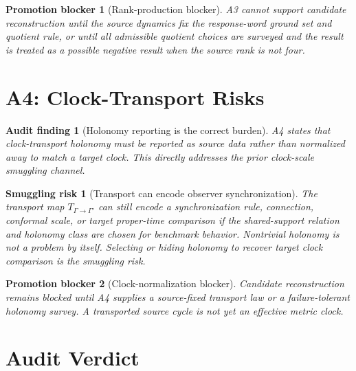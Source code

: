\documentclass[11pt]{article}
\newtheorem{auditfinding}{Audit finding}
\newtheorem{smugglingrisk}{Smuggling risk}
\newtheorem{promotionblocker}{Promotion blocker}
\begin{document}
\begin{promotionblocker}[Rank-production blocker]
A3 cannot support candidate reconstruction until the source dynamics fix the
response-word ground set and quotient rule, or until all admissible quotient
choices are surveyed and the result is treated as a possible negative result
when the source rank is not four.
\end{promotionblocker}

\section{A4: Clock-Transport Risks}

\begin{auditfinding}[Holonomy reporting is the correct burden]
A4 states that clock-transport holonomy must be reported as source data rather
than normalized away to match a target clock. This directly addresses the
prior clock-scale smuggling channel.
\end{auditfinding}

\begin{smugglingrisk}[Transport can encode observer synchronization]
The transport map \(T_{\Gamma\to\Gamma'}\) can still encode a synchronization
rule, connection, conformal scale, or target proper-time comparison if the
shared-support relation and holonomy class are chosen for benchmark behavior.
Nontrivial holonomy is not a problem by itself. Selecting or hiding holonomy
to recover target clock comparison is the smuggling risk.
\end{smugglingrisk}

\begin{promotionblocker}[Clock-normalization blocker]
Candidate reconstruction remains blocked until A4 supplies a source-fixed
transport law or a failure-tolerant holonomy survey. A transported source
cycle is not yet an effective metric clock.
\end{promotionblocker}

\section{Audit Verdict}
\end{document}
